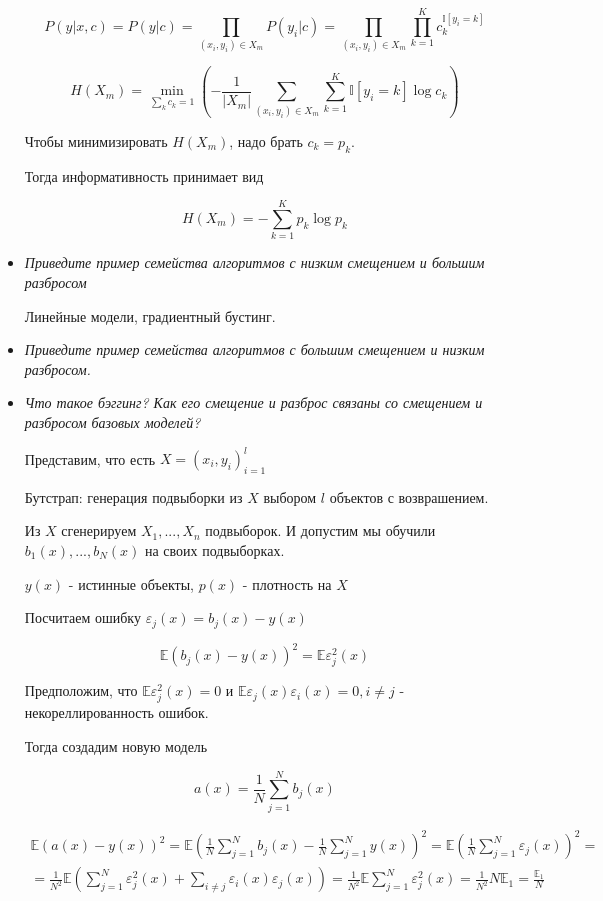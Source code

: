 \documentclass[a4paper]{article}
\begin{document}
\begin{itemize}
\[ P(y|x, c) = P(y|c) = \prod_{(x_i, y_i) \in X_m} P(y_i|c) = \prod_{(x_i, y_i) \in X_m} \prod_{k=1}^K c_k^{\mathbb{I}[y_i=k]}\]

\[ H(X_m) = \min_{\sum_k c_k = 1} \left( -\frac{1}{|X_m|} \sum_{(x_i, y_i) \in X_m} \sum_{k=1}^K \mathbb{I} [y_i = k] \log c_k \right)\]

Чтобы минимизировать $H(X_m)$, надо брать $c_k = p_k$.

Тогда информативность принимает вид 

\[ H(X_m) = - \sum_{k=1}^K p_k \log p_k \]

\item \textit{Приведите пример семейства алгоритмов с низким смещением и большим разбросом}

Линейные модели, градиентный бустинг.

\item \textit{Приведите пример семейства алгоритмов с большим смещением и низким разбросом.}

\item \textit{Что такое бэггинг? Как его смещение и разброс связаны со смещением и разбросом
базовых моделей?}

Представим, что есть $X = (x_i, y_i)_{i=1}^l$

Бутстрап: генерация подвыборки из $X$ выбором $l$ объектов с возврашением.

Из $X$ сгенерируем $X_1, ..., X_n$ подвыборок. И допустим мы обучили $b_1(x), ..., b_N(x)$ на своих подвыборках.

$y(x)$ - истинные объекты, $p(x)$ - плотность на $X$

Посчитаем ошибку $\varepsilon_j(x) = b_j(x) - y(x)$

\[ \mathbb{E} (b_j(x) - y(x))^2 = \mathbb{E} \varepsilon_j^2(x) \]

Предположим, что $\mathbb{E} \varepsilon_j^2(x) = 0$ и $\mathbb{E} \varepsilon_j(x)  \varepsilon_i(x) = 0, i \neq j$ - некореллированность ошибок.

Тогда создадим новую модель

\[ a(x) = \frac{1}{N} \sum_{j=1}^N b_j(x) \]

\begin{equation}
\begin{gathered}
\mathbb{E} (a(x)-y(x))^2 = \mathbb{E} \left( \frac{1}{N} \sum_{j=1}^N b_j(x) - \frac{1}{N} \sum_{j=1}^N y(x) \right)^2 = \mathbb{E} \left( \frac{1}{N} \sum_{j=1}^N \varepsilon_j(x) \right)^2 = \\
= \frac{1}{N^2} \mathbb{E}\left( \sum_{j=1}^N \varepsilon_j^2(x) + \sum_{i \neq j} \varepsilon_i(x) \varepsilon_j(x)  \right) = \frac{1}{N^2} \mathbb{E} \sum_{j=1}^N \varepsilon_j^2(x) = \frac{1}{N^2} N \mathbb{E}_1 = \frac{\mathbb{E}_1}{N}
\end{gathered}
\end{equation}


\end{itemize}
\end{document}
